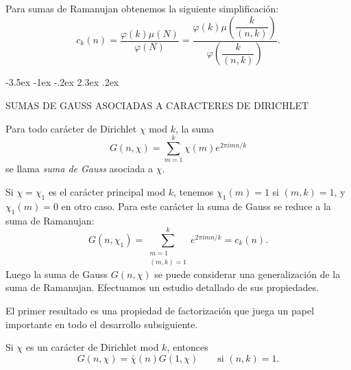 \documentclass[12pt,a4paper]{book}
\makeatletter
\renewcommand\section{\@startsection{section}{1}{\z@}%
  {-3.5ex \@plus -1ex \@minus -.2ex}%
  {2.3ex \@plus .2ex}%
  {\normalfont\Large\bfseries\raggedright}}
\makeatother
\begin{document}
    \begin{ejemplo}
        Para sumas de Ramanujan obtenemos la siguiente simplificación:
        \begin{equation*}
            c_{k}(n)=\frac{\varphi(k)\mu(N)}{\varphi(N)}=
            \frac{\varphi(k)\mu\left(\dfrac{k}{(n,k)}\right)}{\varphi\left(\dfrac{k}{(n,k)}\right)}.
        \end{equation*}
    \end{ejemplo}

    \section{SUMAS DE GAUSS ASOCIADAS A CARACTERES DE DIRICHLET}\label{sim:G}
    \begin{definicion}
        Para todo carácter de Dirichlet $\chi$ mod $k$, la suma
        \begin{equation*}
            G(n,\chi)=\sum_{m=1}^{k}\chi(m)e^{2\pi imn/k}
        \end{equation*}
        se llama \textit{suma de Gauss} asociada a $\chi$.
    \end{definicion}

    Si $\chi=\chi_{1}$ es el carácter principal mod $k$, tenemos $\chi_{1}(m)=1$ si $(m,k)=1$, y
    $\chi_{1}(m)=0$ en otro caso. Para este carácter la suma de Gauss se reduce a la suma de
    Ramanujan:
    \begin{equation*}
        G(n,\chi_{1})=\sum_{\substack{m=1\\(m,k)=1}}^{k}e^{2\pi imn/k}=c_{k}(n).
    \end{equation*}
    Luego la suma de Gauss $G(n,\chi)$ se puede considerar una generalización de la suma de
    Ramanujan. Efectuamos un estudio detallado de sus propiedades.

    El primer resultado es una propiedad de factorización que juega un papel importante en
    todo el desarrollo subsiguiente.

    \begin{teorema}
        Si $\chi$ es un carácter de Dirichlet mod $k$, entonces
        \begin{equation*}
            G(n,\chi)=\bar{\chi}(n)G(1,\chi)\qquad\text{si }(n,k)=1.
        \end{equation*}
    \end{teorema}
\end{document}

